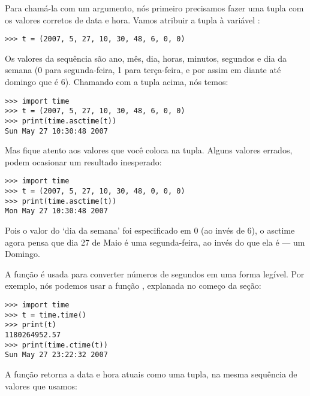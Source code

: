 \noindent
Para chamá-la com um argumento, nós primeiro precisamos fazer uma tupla com os valores corretos de data e hora. Vamos atribuir a tupla à variável :

\begin{listing}
\begin{verbatim}
>>> t = (2007, 5, 27, 10, 30, 48, 6, 0, 0)
\end{verbatim}
\end{listing}

\noindent
Os valores da sequência são ano, mês, dia, horas, minutos, segundos e dia da semana (0 para segunda-feira, 1 para terça-feira, e por assim em diante até domingo que é 6). Chamando  com a tupla acima, nós temos:

\begin{listing}
\begin{verbatim}
>>> import time
>>> t = (2007, 5, 27, 10, 30, 48, 6, 0, 0)
>>> print(time.asctime(t))
Sun May 27 10:30:48 2007
\end{verbatim}
\end{listing}

\noindent
Mas fique atento aos valores que você coloca na tupla. Alguns valores errados, podem ocasionar um resultado inesperado:

\begin{listing}
\begin{verbatim}
>>> import time
>>> t = (2007, 5, 27, 10, 30, 48, 0, 0, 0)
>>> print(time.asctime(t))
Mon May 27 10:30:48 2007
\end{verbatim}
\end{listing}

\noindent
Pois o valor do `dia da semana' foi especificado em 0 (ao invés de 6), o asctime agora pensa que dia 27 de Maio é uma segunda-feira, ao invés do que ela é --- um Domingo.

A função  é usada para converter números de segundos em uma forma legível. Por exemplo, nós podemos usar a função , explanada no começo da seção:

\begin{listingignore}
\begin{verbatim}
>>> import time
>>> t = time.time()
>>> print(t)
1180264952.57
>>> print(time.ctime(t))
Sun May 27 23:22:32 2007
\end{verbatim}
\end{listingignore}

\noindent
A função  retorna a data e hora atuais como uma tupla, na mesma sequência de valores que usamos:

